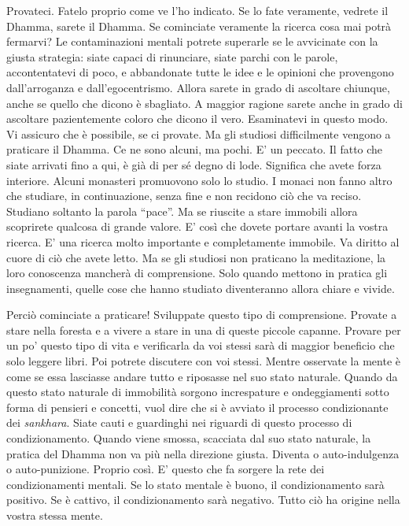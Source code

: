 Provateci. Fatelo proprio come ve l'ho indicato. Se lo fate veramente,
vedrete il Dhamma, sarete il Dhamma. Se cominciate veramente la ricerca
cosa mai potrà fermarvi? Le contaminazioni mentali potrete superarle se
le avvicinate con la giusta strategia: siate capaci di rinunciare, siate
parchi con le parole, accontentatevi di poco, e abbandonate tutte le
idee e le opinioni che provengono dall'arroganza e dall'egocentrismo.
Allora sarete in grado di ascoltare chiunque, anche se quello che dicono
è sbagliato. A maggior ragione sarete anche in grado di ascoltare
pazientemente coloro che dicono il vero. Esaminatevi in questo modo. Vi
assicuro che è possibile, se ci provate. Ma gli studiosi difficilmente
vengono a praticare il Dhamma. Ce ne sono alcuni, ma pochi. E' un
peccato. Il fatto che siate arrivati fino a qui, è già di per sé degno
di lode. Significa che avete forza interiore. Alcuni monasteri
promuovono solo lo studio. I monaci non fanno altro che studiare, in
continuazione, senza fine e non recidono ciò che va reciso. Studiano
soltanto la parola ``pace''. Ma se riuscite a stare immobili allora
scoprirete qualcosa di grande valore. E' così che dovete portare avanti
la vostra ricerca. E' una ricerca molto importante e completamente
immobile. Va diritto al cuore di ciò che avete letto. Ma se gli studiosi
non praticano la meditazione, la loro conoscenza mancherà di
comprensione. Solo quando mettono in pratica gli insegnamenti, quelle
cose che hanno studiato diventeranno allora chiare e vivide.

Perciò cominciate a praticare! Sviluppate questo tipo di comprensione.
Provate a stare nella foresta e a vivere a stare in una di queste
piccole capanne. Provare per un po' questo tipo di vita e verificarla da
voi stessi sarà di maggior beneficio che solo leggere libri. Poi potrete
discutere con voi stessi. Mentre osservate la mente è come se essa
lasciasse andare tutto e riposasse nel suo stato naturale. Quando da
questo stato naturale di immobilità sorgono increspature e ondeggiamenti
sotto forma di pensieri e concetti, vuol dire che si è avviato il
processo condizionante dei \emph{sankhara}. Siate cauti e guardinghi nei
riguardi di questo processo di condizionamento. Quando viene smossa,
scacciata dal suo stato naturale, la pratica del Dhamma non va più nella
direzione giusta. Diventa o auto-indulgenza o auto-punizione. Proprio
così. E' questo che fa sorgere la rete dei condizionamenti mentali. Se
lo stato mentale è buono, il condizionamento sarà positivo. Se è
cattivo, il condizionamento sarà negativo. Tutto ciò ha origine nella
vostra stessa mente.

